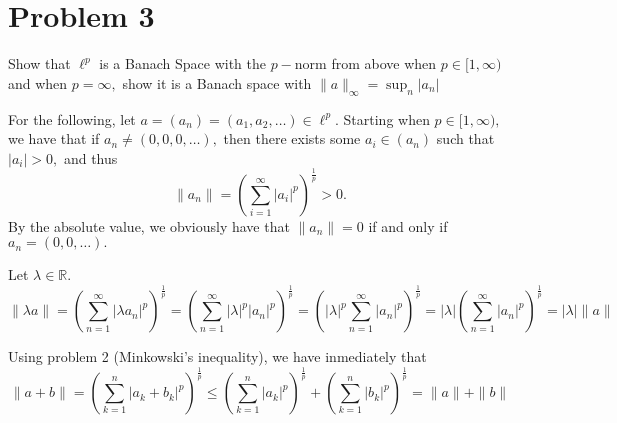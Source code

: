 \documentclass[11pt]{article}
\newcommand{\bbR}{\mathbb{R}}
\begin{document}
\newpage
\section*{Problem 3}
\begin{problem}
Show that $\ell^p$ is a Banach Space with the $p-$norm from above when $p \in [1,\infty)$ and when $p = \infty,$ show it is a Banach space with $\|a\|_\infty = \sup_n{|a_n|}$
\end{problem}
\begin{solution}
For the following, let $a = (a_n) = (a_1, a_2, \dots)\in \ell^p.$
    Starting when $p \in [1,\infty),$ we have that if $a_n \neq (0,0,0,\dots),$ then there exists some $a_i \in (a_n)$ such that $|a_i|>0,$ and thus
    \[\|a_n\| = \left(\sum_{i=1}^\infty |a_i|^p\right)^{\frac{1}{p}} >0.\] By the absolute value, we obviously have that $\|a_n\| = 0$ if and only if $a_n = (0,0,\dots).$ 

    Let $\lambda\in \bbR.$ 
    \[\|\lambda a\| = \left(\sum_{n=1}^\infty |\lambda a_n|^p\right)^{\frac{1}{p}} = \left(\sum_{n=1}^\infty |\lambda|^p |a_n|^p\right)^{\frac{1}{p}} = \left(|\lambda|^p \sum_{n=1}^\infty  |a_n|^p\right)^{\frac{1}{p}} = |\lambda|\left(\sum_{n=1}^\infty  |a_n|^p\right)^{\frac{1}{p}} = |\lambda| \|a\|\]

    Using problem 2 (Minkowski's inequality), we have inmediately that
    \[\|a + b\| = \left(\sum_{k=1}^n|a_k + b_k|^p\right)^{\frac{1}{p}} \leq \left(\sum_{k=1}^n|a_k|^p\right)^{\frac{1}{p}} + \left(\sum_{k=1}^n|b_k|^p\right)^{\frac{1}{p}} = \|a\| + \|b\|\]


\end{solution}
\end{document}
